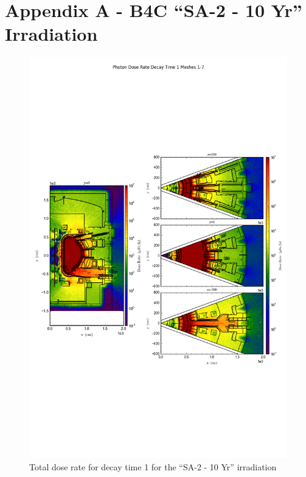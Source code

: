 \documentclass[12pt]{article}
\begin{document}
\section{Appendix A - B4C ``SA-2 - 10 Yr'' Irradiation }
\begin{figure}[ht!]
\centering
\includegraphics[trim={0cm 8cm, 0cm 8cm},clip,scale=0.75]{../plots/final_model_with_b4c/5year/Photon_Dose_Rate_Decay_Time_1_Meshes_1-7.png}
\caption{Total dose rate for decay time 1 for the ``SA-2 - 10 Yr'' irradiation}
\label{fig:photons_5y_dc1_b4c_dose}
\end{figure}
\end{document}
